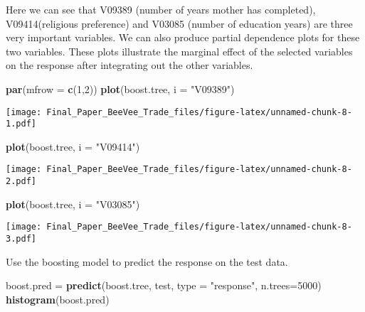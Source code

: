 \documentclass[]{article}
\newenvironment{Shaded}{\begin{snugshade}}{\end{snugshade}}
\newcommand{\KeywordTok}[1]{\textcolor[rgb]{0.13,0.29,0.53}{\textbf{#1}}}
\newcommand{\DataTypeTok}[1]{\textcolor[rgb]{0.13,0.29,0.53}{#1}}
\newcommand{\DecValTok}[1]{\textcolor[rgb]{0.00,0.00,0.81}{#1}}
\newcommand{\StringTok}[1]{\textcolor[rgb]{0.31,0.60,0.02}{#1}}
\newcommand{\NormalTok}[1]{#1}
\begin{document}
Here we can see that V09389 (number of years mother has completed),
V09414(religious preference) and V03085 (number of education years) are
three very important variables. We can also produce partial dependence
plots for these two variables. These plots illustrate the marginal
effect of the selected variables on the response after integrating out
the other variables.

\begin{Shaded}
\begin{Highlighting}[]
\KeywordTok{par}\NormalTok{(}\DataTypeTok{mfrow =} \KeywordTok{c}\NormalTok{(}\DecValTok{1}\NormalTok{,}\DecValTok{2}\NormalTok{))}
\KeywordTok{plot}\NormalTok{(boost.tree, }\DataTypeTok{i =} \StringTok{"V09389"}\NormalTok{)}
\end{Highlighting}
\end{Shaded}

\texttt{[image: Final\_Paper\_BeeVee\_Trade\_files/figure-latex/unnamed-chunk-8-1.pdf]}

\begin{Shaded}
\begin{Highlighting}[]
\KeywordTok{plot}\NormalTok{(boost.tree, }\DataTypeTok{i =} \StringTok{"V09414"}\NormalTok{)}
\end{Highlighting}
\end{Shaded}

\texttt{[image: Final\_Paper\_BeeVee\_Trade\_files/figure-latex/unnamed-chunk-8-2.pdf]}

\begin{Shaded}
\begin{Highlighting}[]
\KeywordTok{plot}\NormalTok{(boost.tree, }\DataTypeTok{i =} \StringTok{"V03085"}\NormalTok{)}
\end{Highlighting}
\end{Shaded}

\texttt{[image: Final\_Paper\_BeeVee\_Trade\_files/figure-latex/unnamed-chunk-8-3.pdf]}

Use the boosting model to predict the response on the test data.

\begin{Shaded}
\begin{Highlighting}[]
\NormalTok{boost.pred =}\StringTok{ }\KeywordTok{predict}\NormalTok{(boost.tree, test, }\DataTypeTok{type =} \StringTok{"response"}\NormalTok{, }\DataTypeTok{n.trees=}\DecValTok{5000}\NormalTok{)}
\KeywordTok{histogram}\NormalTok{(boost.pred)}
\end{Highlighting}
\end{Shaded}
\end{document}

